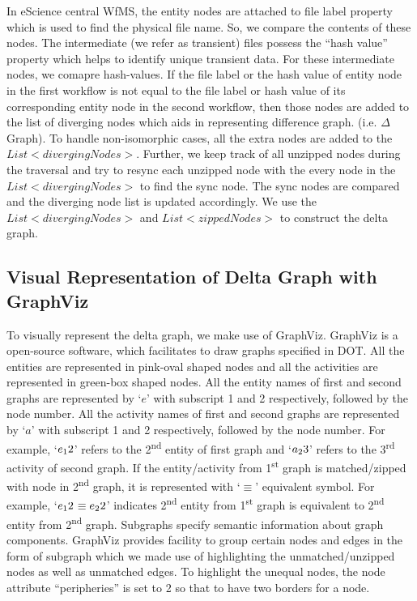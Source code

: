 \documentclass[10pt,conference,twocolumn]{IEEEtran}
\begin{document}
\setlength{\textfloatsep}{5pt}
In eScience central WfMS, the entity nodes are attached to file label property which is used to find the physical file name. So, we compare the contents of these nodes. The intermediate (we refer as transient) files possess the \enquote{hash value} property which helps to identify unique transient data. For these intermediate nodes, we comapre hash-values. If the file label or the hash value of entity node in the first workflow is not equal to the file label or hash value of its corresponding entity node in the second workflow, then those nodes are added to the list of diverging nodes which aids in representing difference graph. (i.e. $\Delta$ Graph). To handle non-isomorphic cases, all the extra nodes are added to the $List<divergingNodes>$. Further, we keep track of all unzipped nodes during the traversal and try to resync each unzipped node with the every node in the $List<divergingNodes>$ to find the sync node. The sync nodes are compared and the  diverging node list is updated accordingly. We use the $List<divergingNodes>$ and $List<zippedNodes>$ to construct the delta graph. 
\subsection{Visual Representation of Delta Graph with GraphViz}
To visually represent the delta graph, we make use of GraphViz. GraphViz is a open-source software, which facilitates to draw graphs specified in DOT\cite{GraphViz}. All the entities are represented in pink-oval shaped nodes and all the activities are represented in green-box shaped nodes. All the entity names of first and second graphs are represented by `$e$' with subscript 1 and 2 respectively, followed by the node number. All the activity names of first and second graphs are represented by `$a$' with subscript 1 and 2 respectively, followed by the node number. For example, `$e\textsubscript{1}2$' refers to the  2\textsuperscript{nd} entity of first graph and `$a\textsubscript{2}3$' refers to the 3\textsuperscript{rd} activity of second graph. 
If the entity/activity from 1\textsuperscript{st} graph is matched/zipped with node in 2\textsuperscript{nd} graph, it is represented with `$\equiv$' equivalent symbol. For example, `$e\textsubscript{1}2$$\equiv$$e\textsubscript{2}2$' indicates 2\textsuperscript{nd} entity from 1\textsuperscript{st} graph is equivalent to 2\textsuperscript{nd} entity from  2\textsuperscript{nd} graph.
Subgraphs specify semantic information about graph components. GraphViz provides facility to group certain nodes and edges in the form of subgraph which we made use of highlighting the unmatched/unzipped nodes as well as unmatched edges. To highlight the unequal nodes, the node attribute \enquote{peripheries} is set to 2 so that to have two borders for a node.
\end{document}
